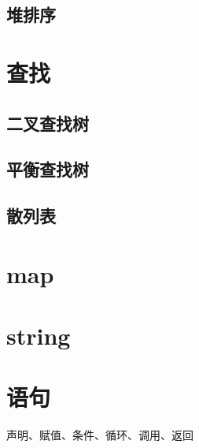 \documentclass[UTF8]{ctexart}
\begin{document}
\subsection{堆排序}

\section{查找}
\subsection{二叉查找树}
\subsection{平衡查找树}
\subsection{散列表}

\section{map}

\section{string}

\section{语句}
声明、赋值、条件、循环、调用、返回
\end{document}
